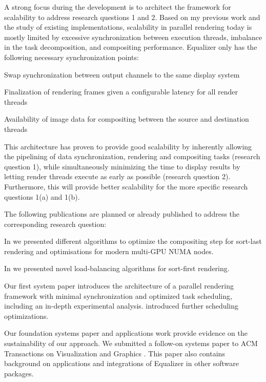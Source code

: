  A strong focus during the development is to architect the framework for
 scalability to address research questions 1 and 2. Based on my previous work and
 the study of existing implementations, scalability in parallel rendering today
 is mostly limited by excessive synchronization between execution threads,
 imbalance in the task decomposition, and compositing performance. Equalizer only
 has the following necessary synchronization points:
 \begin{compactenum}
  \item Swap synchronization between output channels to the same display system
  \item Finalization of rendering frames given a configurable latency for all render threads
  \item Availability of image data for compositing between the source and destination threads
 \end{compactenum}
 This architecture has proven to provide good scalability by inherently allowing
 the pipelining of data synchronization, rendering and compositing tasks
 (research question 1), while simultaneously minimizing the time to display
 results by letting render threads execute as early as possible (research
 question 2). Furthermore, this will provide better scalability for the more
 specific research questions 1(a) and 1(b).

 The following publications are planned or already published to address the corresponding research question:
 \begin{compactenum}
  \item
  \begin{compactenum}
   \item In \cite{EP:07, MEP:10, EBAHMP:12} we presented different algorithms to optimize the compositing step for sort-last rendering and optimisations for modern multi-GPU NUMA nodes.
   \item In \cite{EEP:11, SPEP:16} we presented novel load-balancing algorithms for sort-first rendering.
  \end{compactenum}
  \item Our first system paper \cite{EMP:09} introduces the architecture of a parallel rendering framework with minimal synchronization and optimized task scheduling, including an in-depth experimental analysis. \cite{EBAHMP:12} introduced further scheduling optimizations.
  \item Our foundation systems paper \cite{EMP:09} and applications work \cite{HBBES:13} provide evidence on the sustainability of our approach. We submitted a follow-on systems paper to ACM Transactions on Visualization and Graphics \cite{ESP:18}. This paper also contains background on applications and integrations of Equalizer in other software packages.
 \end{compactenum}

